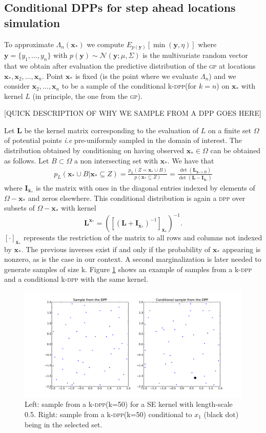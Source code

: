 \documentclass{article} %
\newcommand{\bx}{\textbf{x}}
\newcommand{\by}{\textbf{y}}
\newcommand{\bL}{\textbf{L}}
\newcommand{\bI}{\textbf{I}}
\newcommand{\N}{\mathcal{N}}
\newcommand{\acr}[1]{\textsc{#1}\xspace}
\newcommand{\gp}{\acr{gp}}
\newcommand{\dpp}{\acr{dpp}}
\begin{document}
\subsection{Conditional DPPs for step ahead locations simulation}

To approximate $\Lambda_n(\bx_*)$ we compute  $E_{p(\by)} [\min (\by,\eta)]$ where $\by=\{y_1,\dots,y_n\}$ with $p(\by) \sim \N(\by; \mu, \Sigma)$ is the multivariate random vector that we obtain after evaluation the predictive distribution of the \gp at locations $\bx_*,\bx_2,\dots,\bx_n$. Point $\bx_*$ is fixed (is the point where we evaluate $\Lambda_n$) and we consider $\bx_2,\dots,\bx_n$ to be a sample of the conditional k-\dpp (for $k=n$) on $\bx_*$ with kernel $L$ (in principle, the one from the \gp).
 
[QUICK DESCRIPTION OF WHY WE SAMPLE FROM A DPP GOES HERE]

Let $\bL$ be the kernel matrix corresponding to the evaluation of $L$ on a finite set $\Omega$ of potential points \emph{i.e} pre-uniformly sampled in the domain of interest.  The distribution obtained by conditioning on having observed $\bx_* \in \Omega$ can be obtained as follows. Let $B \subset \Omega$ a non intersecting set with $\bx_*$. We have that
\begin{eqnarray}
p_L(\bx_* \cup B | \bx_* \subseteq Z ) = \frac{p_L(Z = \bx_* \cup B ) }{p(\bx_* \subseteq Z)} = \frac{\det(\bL_{\bx_* \cup B})}{\det(\bL - \bI_{\bar{\bx}_*} ) }
\end{eqnarray}
where $\bI_{\bar{\bx}_*}$ is the matrix with ones in the diagonal entries indexed by elements of $\Omega - \bx_*$ and zeros elsewhere.  This conditional distribution is again a \dpp over subsets of $\Omega-\bx_*$ \citep{Borodin*Rains*2005} with kernel 
$$\bL^{\bx_*} = \left( [   (\bL + \bI_{\bar{\bx}_*})^{-1}]_{\bar{\bx}_*} \right)^{-1}.$$
$[\cdot ]_{\bar{\bx}_*}$ represents the restriction of the matrix to all rows and columns not indexed by $\bx_*$. The previous inverses exist if and only if the probability of $\bx_*$ appearing is nonzero, as is the case in our context. A second marginalization is later needed to generate samples of size k.  Figure \ref{fig1} shows an example of samples from a k-\dpp and a conditional k-\dpp with the same kernel.
 
\begin{figure}[ht]
    \centering
  \includegraphics[width=.9\textwidth]{conditional_dpp.pdf}
\caption{Left: sample from a k-\dpp (k=50) for a SE kernel with length-scale 0.5. Right: sample from a k-\dpp (k=50) conditional to $x_1$ (black dot) being in the selected set. }
    \label{fig1}
\end{figure}
\end{document}
